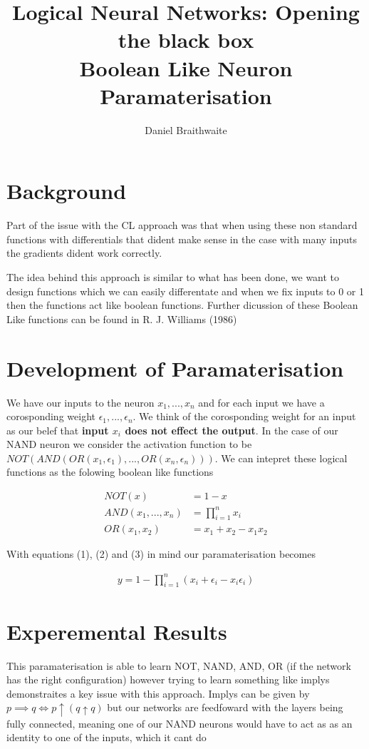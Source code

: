 \documentclass{article}
\title{%
	Logical Neural Networks: Opening the black box\\
	\large Boolean Like Neuron Paramaterisation
}
\author{Daniel Braithwaite}
\begin{document}
\maketitle

\section{Background}
Part of the issue with the CL approach was that when using these non standard functions with differentials that dident make sense in the case with many inputs the gradients dident work correctly.

The idea behind this approach is similar to what has been done, we want to design functions which we can easily differentate and when we fix inputs to 0 or 1 then the functions act like boolean functions. Further dicussion of these Boolean Like functions can be found in R. J. Williams (1986) \cite{logicOfActivationFunctions}

\section{Development of Paramaterisation}
We have our inputs to the neuron $x_1, ..., x_n$ and for each input we have a corosponding weight $\epsilon_1, ..., \epsilon_n$. We think of the corosponding weight for an input as our belef that \textbf{input $x_i$ does not effect the output}. In the case of our NAND neuron we consider the activation function to be \\$NOT(AND(OR(x_1, \epsilon_1), ..., OR(x_n, \epsilon_n)))$. We can intepret these logical functions as the folowing boolean like functions

\begin{align}
NOT(x) &= 1 - x\\
AND(x_1, ..., x_n) &= \prod_{i=1}^n x_i\\
OR(x_1, x_2) &= x_1 + x_2 - x_1x_2
\end{align}

With equations (1), (2) and (3) in mind our paramaterisation becomes

\begin{align}
y = 1 - \prod_{i=1}^n (x_i + \epsilon_i - x_i \epsilon_i) 
\end{align}

\section{Experemental Results}
This paramaterisation is able to learn NOT, NAND, AND, OR (if the network has the right configuration) however trying to learn something like implys demonstraites a key issue with this approach. Implys can be given by $p \implies q \iff p \uparrow (q \uparrow q)$ but our networks are feedfoward with the layers being fully connected, meaning one of our NAND neurons would have to act as as an identity to one of the inputs, which it cant do

\medskip


\end{document}
